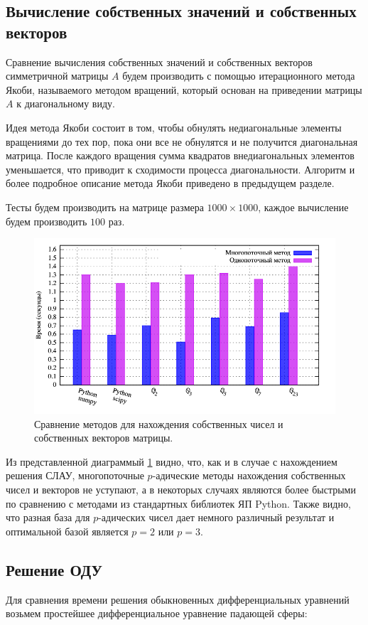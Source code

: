 \documentclass[master, och, diploma, times]{sty/SCWorks}
\theoremstyle{plain}
\theoremstyle{definition}
\numberwithin{equation}{section}
\begin{document}
\subsection{Вычисление собственных значений и собственных векторов}
Сравнение вычисления собственных значений и собственных векторов симметричной матрицы $A$ будем производить с помощью итерационного метода Якоби, называемого методом вращений, который основан на приведении матрицы $A$ к диагональному виду.

Идея метода Якоби состоит в том, чтобы обнулять недиагональные элементы вращениями до тех пор, пока они все не обнулятся и не получится диагональная матрица. После каждого вращения сумма квадратов внедиагональных элементов уменьшается, что приводит к сходимости процесса диагональности. Алгоритм и более подробное описание метода Якоби приведено в предыдущем разделе.

Тесты будем производить на матрице размера $1000 \times 1000$, каждое вычисление будем производить $100$ раз. 

\begin{figure}[H]
\centerline{\includegraphics[width=0.85\linewidth]{../gnuplot/multi/jacoby/plot.png}}
\caption{Сравнение методов для нахождения собственных чисел и собственных векторов матрицы.}
\label{img:multi:jacoby}
\end{figure}

Из представленной диаграммый \ref{img:multi:jacoby} видно, что, как и в случае с нахождением решения СЛАУ, многопоточные $p$-адические методы нахождения собственных чисел и векторов не уступают, а в некоторых случаях являются более быстрыми по сравнению с методами из стандартных библиотек ЯП Python. Также видно, что разная база для $p$-адических чисел дает немного различный результат и оптимальной базой является $p=2$ или $p=3$.

\subsection{Решение ОДУ}
Для сравнения времени решения обыкновенных дифференциальных уравнений возьмем простейшее дифференциальное уравнение падающей \mbox{сферы:}
\end{document}
